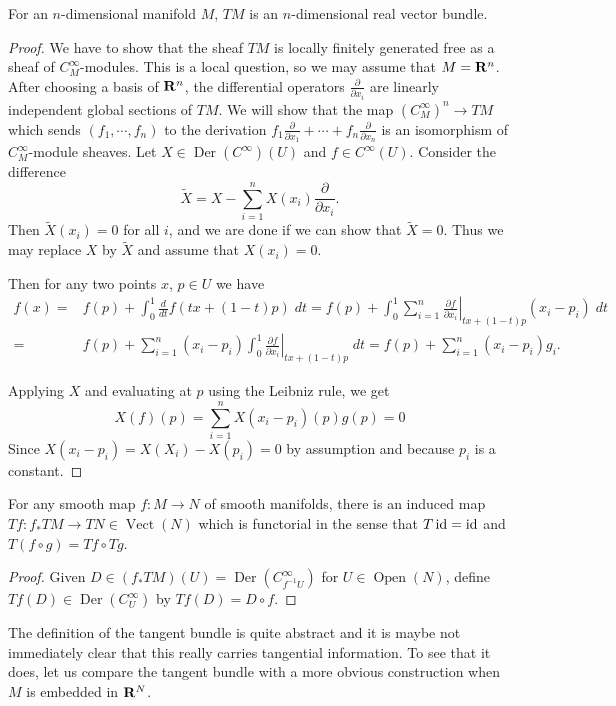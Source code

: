 \documentclass[a4paper,openany]{scrbook}
\DeclareMathOperator{\Vect}{Vect}
\DeclareMathOperator{\Open}{Open}
\DeclareMathOperator{\Der}{Der}
\begin{document}
\begin{thm} \label{thm:tangentspacebundle}
For an $n$-dimensional manifold $M$, $TM$ is an $n$-dimensional real vector bundle.
\end{thm}
\begin{proof}
We have to show that the sheaf $TM$ is locally finitely generated free as a sheaf of $C^\infty_M$-modules. This is a local question, so we may assume that $M = \mathbf R^n$. After choosing a basis of $\mathbf R^n$, the differential operators $\frac\partial{\partial x_i}$ are linearly independent global sections of $TM$. We will show that the map $(C^\infty_M)^n \to TM$ which sends $(f_1,\cdots,f_n)$ to the derivation $f_1\frac\partial{\partial x_1}+\cdots+f_n\frac\partial{\partial x_n}$ is an isomorphism of $C^\infty_M$-module sheaves. Let $X \in \Der(C^\infty)(U)$ and $f \in C^\infty(U)$. Consider the difference
\[
\tilde X = X - \sum_{i=1}^n X(x_i) \frac\partial{\partial x_i}.
\]
Then $\tilde X(x_i) = 0$ for all $i$, and we are done if we can show that $\tilde X=0$. Thus we may replace $X$ by $\tilde X$ and assume that $X(x_i)=0$.

Then for any two points $x$, $p \in U$ we have
\begin{align*}
f(x) = & f(p)+\int_0^1 \frac d {dt} f(tx+(1-t)p)\; dt = f(p) + \int_0^1 \sum_{i=1}^n\left.\frac{\partial f}{\partial x_i}\right|_{tx+(1-t)p} (x_i-p_i)\; dt \\
= & f(p) + \sum_{i=1}^n (x_i-p_i) \int_0^1 \left.\frac{\partial f}{\partial x_i}\right|_{tx+(1-t)p}\; dt = f(p) + \sum_{i=1}^n (x_i-p_i) g_i.
\end{align*}

Applying $X$ and evaluating at $p$ using the Leibniz rule, we get
\[
X(f)(p) = \sum_{i=1}^n X(x_i-p_i)(p) g(p) = 0
\]
Since $X(x_i-p_i) = X(X_i) - X(p_i) = 0$ by assumption and because $p_i$ is a constant.
\end{proof}


\begin{thm}
For any smooth map $f\colon M \to N$ of smooth manifolds, there is an induced map $Tf\colon f_*TM \to TN \in \Vect(N)$ which is functorial in the sense that $T\operatorname{id}=\operatorname{id}$ and $T(f \circ g)=Tf \circ Tg$.
\end{thm}
\begin{proof}
Given $D \in (f_*TM)(U) = \Der(C^\infty_{f^{-1}U})$ for $U \in \Open(N)$, define $Tf(D) \in \Der(C^\infty_U)$ by $Tf(D) = D \circ f$.
\end{proof}

The definition of the tangent bundle is quite abstract and it is maybe not immediately clear that this really carries tangential information. To see that it does, let us compare the tangent bundle with a more obvious construction when $M$ is embedded in $\mathbf R^N$.
\end{document}
